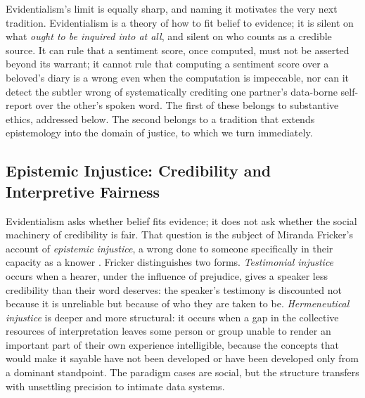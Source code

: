 Evidentialism's limit is equally sharp, and naming it motivates the very next tradition. Evidentialism is a theory of how to fit belief to evidence; it is silent on what \emph{ought to be inquired into at all}, and silent on who counts as a credible source. It can rule that a sentiment score, once computed, must not be asserted beyond its warrant; it cannot rule that computing a sentiment score over a beloved's diary is a wrong even when the computation is impeccable, nor can it detect the subtler wrong of systematically crediting one partner's data-borne self-report over the other's spoken word. The first of these belongs to substantive ethics, addressed below. The second belongs to a tradition that extends epistemology into the domain of justice, to which we turn immediately.

\subsection{Epistemic Injustice: Credibility and Interpretive Fairness}\label{p01:sec:epistemic-injustice}

Evidentialism asks whether belief fits evidence; it does not ask whether the social machinery of credibility is fair. That question is the subject of Miranda Fricker's account of \emph{epistemic injustice}, a wrong done to someone specifically in their capacity as a knower \parencite{fricker2007epistemic}. Fricker distinguishes two forms. \emph{Testimonial injustice} occurs when a hearer, under the influence of prejudice, gives a speaker less credibility than their word deserves: the speaker's testimony is discounted not because it is unreliable but because of who they are taken to be. \emph{Hermeneutical injustice} is deeper and more structural: it occurs when a gap in the collective resources of interpretation leaves some person or group unable to render an important part of their own experience intelligible, because the concepts that would make it sayable have not been developed or have been developed only from a dominant standpoint. The paradigm cases are social, but the structure transfers with unsettling precision to intimate data systems.

